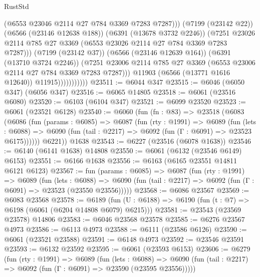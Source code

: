 \begin{lexlean}{RustStd}
\begin{coremodule}
{\begin{coremodule}
{{{{{{{{{{{{{{{{{{{{{{{{{{                                  (@6553 @23046 @2114 @27 @784 @3369 @7283 @7287)))
                              (@7199 (@23142 @22))
                              (@6566 (@23146 @12638 @188))
                              (@6391 (@13678 @3732 @2246))
                              (@7251
                                @23026
                                @2114
                                @785
                                @27
                                @3369
                                (@6553 @23026 @2114 @27 @784 @3369 @7283 @7287)))
                            (@7199 (@23142 @37))
                            (@6566 (@23146 @12639 @164))
                            (@6391 (@13710 @3724 @2246))
                            (@7251
                              @23006
                              @2114
                              @785
                              @27
                              @3369
                              (@6553 @23006 @2114 @27 @784 @3369 @7283 @7287)))
                          @11903
                          (@6566 (@13771 @1616 @12640))
                          @11915)))))))))))
@23511 := @6044 @347
@23515 := @6046 (@6050 @347) (@6056 @347)
@23516 := @6065 @14805
@23518 := @6061 (@23516 @6080)
@23520 := @6103 (@6104 @347)
@23521 := @6099 @23520
@23523 := @6061 (@23521 @6128)
@23540 := @6060
    (fun (fn : @83) =>
    @23518
      (@6083
        (@6086
          (fun (params : @6085) =>
          @6087
            (fun (rty : @1991) =>
            @6089
              (fun (lets : @6088) =>
              @6090 (fun (tail : @2217) => @6092 (fun (Γ : @6091) => @23523 @6175))))))
        @6221))
    @1638
@23543 := @6227 (@23516 (@6078 @1638))
@23546 := @6140 (@6141 @1638) @14808
@23550 := @6061 (@6132 (@23546 @6149) @6153)
@23551 := @6166 @1638
@23556 := @6163 (@6165 @23551 @14811 @6121 @6123)
@23567 := fun (params : @6085) =>
  @6087
    (fun (rty : @1991) =>
    @6089
      (fun (lets : @6088) =>
      @6090 (fun (tail : @2217) => @6092 (fun (Γ : @6091) => @23523 (@23550 @23556)))))
@23568 := @6086 @23567
@23569 := @6083 @23568
@23578 := @6189
    (fun (U : @6188) => @6190 (fun (t : @7) => @6198 (@6061 (@6204 @14808 @6079) @6215)))
@23581 := @23543 (@23569 @23578) @14806
@23583 := @6046 @23568 @23578
@23585 := @6276 @23567 @4973
@23586 := @6113 @4973
@23588 := @6111 (@23586 @6126)
@23590 := @6061 (@23521 @23588)
@23591 := @6148 @4973
@23592 := @23546 @23591
@23593 := @6132 @23592
@23595 := @6061 (@23593 @6153)
@23606 := @6279
    (fun (rty : @1991) =>
    @6089
      (fun (lets : @6088) =>
      @6090 (fun (tail : @2217) => @6092 (fun (Γ : @6091) => @23590 (@23595 @23556)))))
}}}}}}}}}}}}}}}}}}}}}}}}}}
\end{coremodule}}
\end{coremodule}
\end{lexlean}
